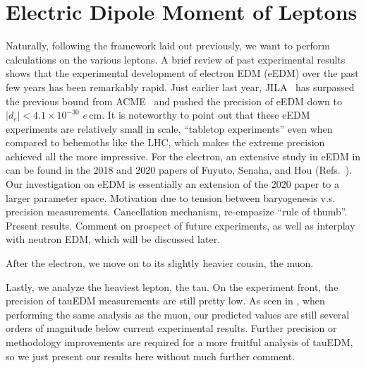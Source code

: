 \chapter{Electric Dipole Moment of Leptons}
\label{ch:leptonEDM}

Naturally, following the framework laid out previously, we want to perform calculations on the various leptons.
A brief review of past experimental results shows that the experimental development of electron EDM (eEDM) over the past few years has been remarkably rapid.
Just earlier last year, JILA~\cite{JILA23} has surpassed the previous bound from ACME~\cite{ACME18} and pushed the precision of eEDM down to \(|d_{e}| < 4.1 \times 10^{-30}\) \(e\,\mathrm{cm} \).
It is noteworthy to point out that these eEDM experiments are relatively small in scale, ``tabletop experiments'' even when compared to behemoths like the LHC, which makes the extreme precision achieved all the more impressive.
For the electron, an extensive study in eEDM in {\gthdm} can be found in the 2018 and 2020 papers of Fuyuto, Senaha, and Hou (Refs.~\cite{FSH20}).
Our investigation on eEDM is essentially an extension of the 2020 paper to a larger parameter space.
Motivation due to tension between baryogenesis v.s. precision measurements.
Cancellation mechanism, re-empasize ``rule of thumb''.
Present results.
Comment on prospect of future experiments, as well as interplay with neutron EDM, which will be discussed later.

After the electron, we move on to its slightly heavier cousin, the muon. 

Lastly, we analyze the heaviest lepton, the tau. 
On the experiment front, the precision of tauEDM measurements are still pretty low.
As seen in , when performing the same analysis as the muon, our predicted values are still several orders of magnitude below current experimental results.
Further precision or methodology improvements are required for a more fruitful analysis of tauEDM, so we just present our results here without much further comment.
